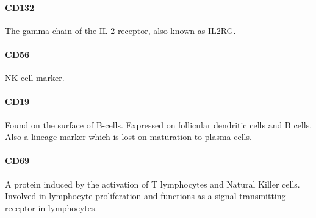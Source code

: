 \paragraph{CD132}
The gamma chain of the IL-2 receptor, also known as IL2RG.

\paragraph{CD56}
NK cell marker.


\paragraph{CD19}
Found on the surface of B-cells.
Expressed on follicular dendritic cells and B cells.
Also a lineage marker which is lost on maturation to plasma cells.

\paragraph{CD69}
A protein induced by the activation of T lymphocytes and Natural Killer cells.
Involved in lymphocyte proliferation and functions as a signal-transmitting receptor in lymphocytes.

